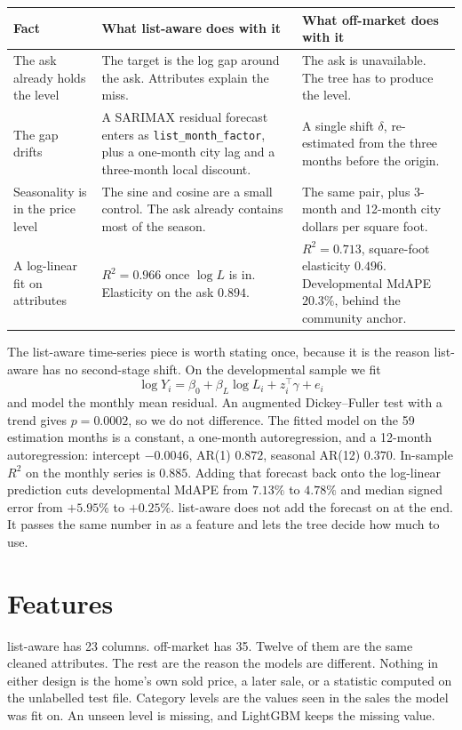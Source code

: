 \documentclass[11pt]{article}
\newcommand{\la}{list-aware}
\newcommand{\om}{off-market}
\begin{document}
\begin{center}
\small
\begin{tabular}{p{4.2cm}p{5.2cm}p{5.2cm}}
\toprule
Fact & What \la{} does with it & What \om{} does with it \\
\midrule
The ask already holds the level & The target is the log gap around the ask. Attributes explain the miss. & The ask is unavailable. The tree has to produce the level. \\
The gap drifts & A SARIMAX residual forecast enters as \texttt{list\_month\_factor}, plus a one-month city lag and a three-month local discount. & A single shift \(\delta\), re-estimated from the three months before the origin. \\
Seasonality is in the price level & The sine and cosine are a small control. The ask already contains most of the season. & The same pair, plus 3-month and 12-month city dollars per square foot. \\
A log-linear fit on attributes & \(R^2 = 0.966\) once \(\log L\) is in. Elasticity on the ask \(0.894\). & \(R^2 = 0.713\), square-foot elasticity \(0.496\). Developmental MdAPE \(20.3\%\), behind the community anchor. \\
\bottomrule
\end{tabular}
\end{center}

The list-aware time-series piece is worth stating once, because it is the reason \la{} has no second-stage shift. On the developmental sample we fit
\[
\log Y_i = \beta_0 + \beta_L \log L_i + z_i^\top\gamma + e_i
\]
and model the monthly mean residual. An augmented Dickey--Fuller test with a trend gives \(p = 0.0002\), so we do not difference. The fitted model on the 59 estimation months is a constant, a one-month autoregression, and a 12-month autoregression: intercept \(-0.0046\), AR(1) \(0.872\), seasonal AR(12) \(0.370\). In-sample \(R^2\) on the monthly series is \(0.885\). Adding that forecast back onto the log-linear prediction cuts developmental MdAPE from \(7.13\%\) to \(4.78\%\) and median signed error from \(+5.95\%\) to \(+0.25\%\). \la{} does not add the forecast on at the end. It passes the same number in as a feature and lets the tree decide how much to use.

\section{Features}
\label{sec:features}

\la{} has 23 columns. \om{} has 35. Twelve of them are the same cleaned attributes. The rest are the reason the models are different. Nothing in either design is the home's own sold price, a later sale, or a statistic computed on the unlabelled test file. Category levels are the values seen in the sales the model was fit on. An unseen level is missing, and LightGBM keeps the missing value.
\end{document}
